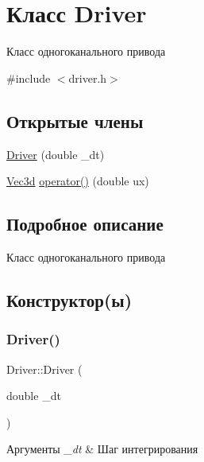 \hypertarget{classDriver}{}\section{Класс Driver}
\label{classDriver}


Класс одногоканального привода  




{\ttfamily \#include $<$driver.\+h$>$}

\subsection*{Открытые члены}
\begin{DoxyCompactItemize}
\item 
\hyperlink{classDriver_a62215da042c694ceea51b2d65605db1f}{Driver} (double \+\_\+dt)
\item 
\hyperlink{structVec3}{Vec3d} \hyperlink{classDriver_a15e3c21483960b7a7af260273e95f294}{operator()} (double ux)
\end{DoxyCompactItemize}


\subsection{Подробное описание}
Класс одногоканального привода 

\subsection{Конструктор(ы)}
\mbox{\label{classDriver_a62215da042c694ceea51b2d65605db1f}} 
\subsubsection{\texorpdfstring{Driver()}{Driver()}}
{\footnotesize\ttfamily Driver\+::\+Driver (\begin{DoxyParamCaption}\item[{double}]{\+\_\+dt }\end{DoxyParamCaption})\hspace{0.3cm}{\ttfamily [inline]}}


\begin{DoxyParams}{Аргументы}
{\em \+\_\+dt} & Шаг интегрирования \\
\hline
\end{DoxyParams}


